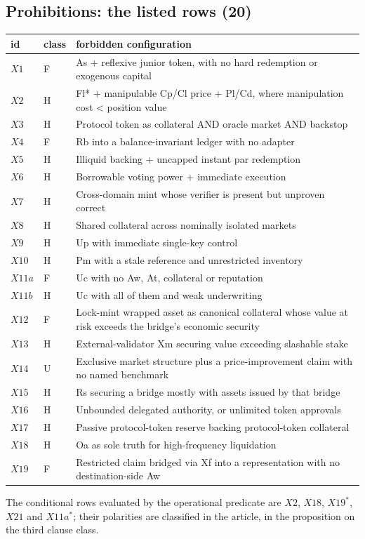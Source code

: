 \subsection{Prohibitions: the listed rows (20)}

\begin{longtable}{lll}
\toprule
id & class & forbidden configuration\\
\midrule\endhead
$X1$ & F & As + reflexive junior token, with no hard redemption or exogenous capital\\
$X2$ & H & Fl* + manipulable Cp/Cl price + Pl/Cd, where manipulation cost < position value\\
$X3$ & H & Protocol token as collateral AND oracle market AND backstop\\
$X4$ & F & Rb into a balance-invariant ledger with no adapter\\
$X5$ & H & Illiquid backing + uncapped instant par redemption\\
$X6$ & H & Borrowable voting power + immediate execution\\
$X7$ & H & Cross-domain mint whose verifier is present but unproven correct\\
$X8$ & H & Shared collateral across nominally isolated markets\\
$X9$ & H & Up with immediate single-key control\\
$X10$ & H & Pm with a stale reference and unrestricted inventory\\
$X11a$ & F & Uc with no Aw, At, collateral or reputation\\
$X11b$ & H & Uc with all of them and weak underwriting\\
$X12$ & F & Lock-mint wrapped asset as canonical collateral whose value at risk exceeds the bridge's economic security\\
$X13$ & H & External-validator Xm securing value exceeding slashable stake\\
$X14$ & U & Exclusive market structure plus a price-improvement claim with no named benchmark\\
$X15$ & H & Rs securing a bridge mostly with assets issued by that bridge\\
$X16$ & H & Unbounded delegated authority, or unlimited token approvals\\
$X17$ & H & Passive protocol-token reserve backing protocol-token collateral\\
$X18$ & H & Oa as sole truth for high-frequency liquidation\\
$X19$ & F & Restricted claim bridged via Xf into a representation with no destination-side Aw\\
\bottomrule
\end{longtable}

The conditional rows evaluated by the operational predicate are $X2$, $X18$,
$X19^{*}$, $X21$ and $X11a^{*}$; their polarities are classified in
the article, in the proposition on the third clause class.

